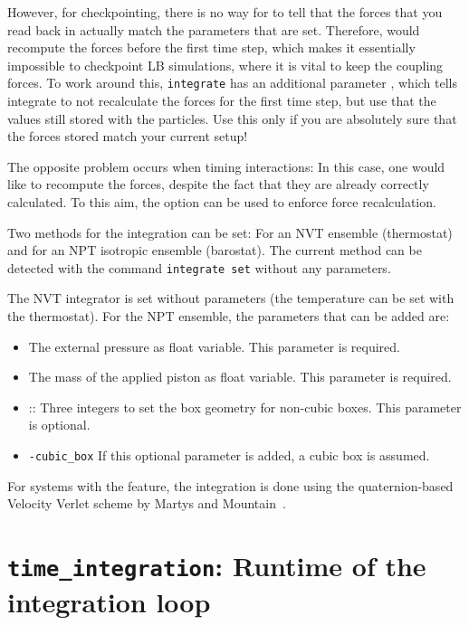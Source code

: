 However, for checkpointing, there is no way for \es{} to tell that the forces that you
read back in actually match the parameters that are set. Therefore, \es{} would recompute
the forces before the first time step, which makes it essentially impossible to checkpoint
LB simulations, where it is vital to keep the coupling forces. To work
around this, \texttt{integrate}
has an additional parameter , which tells integrate to not recalculate
the forces for the first time step, but use that the values still stored with the particles.
Use this only if you are absolutely sure that the forces stored match your current setup!

The opposite problem occurs when timing interactions: In this case,
one would like to recompute the forces, despite the fact that they are
already correctly calculated. To this aim, the option
 can be used to enforce force recalculation.

Two methods for the integration can be set: For an NVT ensemble
(thermostat) and for an NPT isotropic ensemble (barostat). The current
method can be detected with the command \texttt{integrate set} without
any parameters.

The NVT integrator is set without parameters (the temperature can be
set with the thermostat). For the NPT ensemble, the parameters that
can be added are:

\begin{itemize}
\item {} The external pressure as float variable. This
  parameter is required.
\item {} The mass of the applied piston as float
  variable. This parameter is required.
\item {}:: Three integers to set the box geometry for
  non-cubic boxes. This parameter is optional.
\item \texttt{-cubic_box} If this optional parameter is added, a cubic
  box is assumed.
\end{itemize}

For systems with the  feature, the integration is done using the
quaternion-based Velocity Verlet scheme by Martys and Mountain~\cite{martys99}.

\section{\texttt{time_integration}: Runtime of the integration loop}

